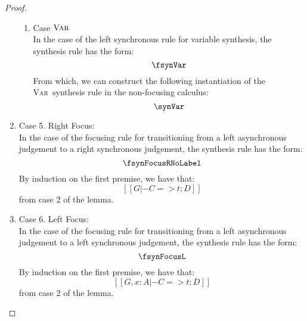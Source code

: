 \begin{proof}
\begin{enumerate}
\begin{enumerate}
      \item Case $\textsc{Var}$ \\
        In the case of the left synchronous rule for variable synthesis, the synthesis rule has the form:
          \[
          \fsynVar
          \]
          From which, we can construct the following instantiation of the \textsc{Var}\ synthesis rule in the non-focusing calculus:
          \[
            \synVar
          \]
    \end{enumerate}
\item Case 5. Right Focus: \\
          In the case of the focusing rule for transitioning from a left asynchronous judgement to a right synchronous judgement, the synthesis rule has the form:
          \[
            \fsynFocusRNoLabel
          \]
          By induction on the first premise, we have that:
          \[
            [[ G |- C => t ; D ]] \tag{ih}
          \]
          from case 2 of the lemma.
\item Case 6. Left Focus: \\
          In the case of the focusing rule for transitioning from a left asynchronous judgement to a left synchronous judgement, the synthesis rule has the form:
          \[
            \fsynFocusL
          \]
          By induction on the first premise, we have that:
          \[
            [[ G, x : A |- C => t ; D ]] \tag{ih}
          \]
          from case 2 of the lemma.
\end{enumerate}
\end{proof}
